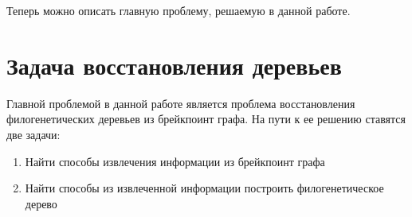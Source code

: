 Теперь можно описать главную проблему, решаемую в данной работе.

\section{Задача восстановления деревьев}
Главной проблемой в данной работе является проблема восстановления филогенетических деревьев из брейкпоинт графа.
На пути к ее решению ставятся две задачи:
\begin{enumerate}
  \item Найти способы извлечения информации из брейкпоинт графа
  \item Найти способы из извлеченной информации построить филогенетическое дерево
\end{enumerate}
